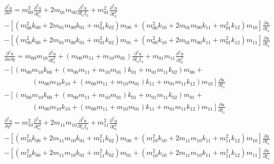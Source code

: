 \documentclass[a4paper,12pt]{article}
\begin{document}
\begin{eqnarray}
&&\displaystyle{\frac{\partial^2 u}{\partial x^2} = m_{00}^2\frac{\partial^2 u}{\partial \xi_1^2} +  2m_{01}m_{00}\frac{\partial^2 u}{\partial \xi_1 \xi_2} + m_{01}^2\frac{\partial^2 u}{\partial \xi_2^2} }\\[3mm]
&&\displaystyle{ - \left[ \left(m_{00}^2 k_{00} + 2m_{01}m_{00}k_{01} + m_{01}^2 k_{02} \right)m_{00} + \left(m_{00}^2 k_{10} + 2m_{01}m_{00}k_{11} + m_{01}^2 k_{12} \right)m_{10}\right] \frac{\partial u}{\partial \xi_1}}\nonumber\\[3mm]
&&\displaystyle{ - \left[ \left(m_{00}^2 k_{00} + 2m_{01}m_{00}k_{01} + m_{01}^2 k_{02} \right)m_{01} + \left(m_{00}^2 k_{10} + 2m_{01}m_{00}k_{11} + m_{01}^2 k_{12} \right)m_{11}\right] \frac{\partial u}{\partial \xi_1}}
\nonumber\\[50mm]
&&\displaystyle{\frac{\partial^2 u}{\partial x \partial y} = m_{00}m_{10}\frac{\partial^2 u}{\partial \xi_1^2} +  (m_{00}m_{11} + m_{10}m_{01})\frac{\partial^2 u}{\partial \xi_1 \xi_2} + m_{01}m_{11}\frac{\partial^2 u}{\partial \xi_2^2} }\\[3mm]
&&\displaystyle{ - \left[ \left(m_{00}m_{10} k_{00} + (m_{00}m_{11} + m_{10}m_{01})k_{01} + m_{01}m_{11} k_{02} \right)m_{00} + \right.}\nonumber\\[3mm]
&&\displaystyle{\qquad\qquad\left. \left(m_{00}m_{10} k_{10} + (m_{00}m_{11} + m_{10}m_{01})k_{11} + m_{01}m_{11} k_{12} \right)m_{10}\right] \frac{\partial u}{\partial \xi_1}}\nonumber\\[3mm]
&&\displaystyle{ - \left[ \left(m_{00}m_{10} k_{00} + (m_{00}m_{11} + m_{10}m_{01})k_{01} + m_{01}m_{11} k_{02} \right)m_{01} + \right.}\nonumber\\[3mm]
&&\displaystyle{\qquad\qquad\left.\left(m_{00}m_{10} k_{10} + (m_{00}m_{11} + m_{10}m_{01})k_{11} + m_{01}m_{11} k_{12} \right)m_{11}\right] \frac{\partial u}{\partial \xi_1}}
\nonumber\\[3mm]
&&\displaystyle{\frac{\partial^2 u}{\partial y^2} = m_{10}^2\frac{\partial^2 u}{\partial \xi_1^2} +  2m_{11}m_{10}\frac{\partial^2 u}{\partial \xi_1 \xi_2} + m_{11}^2\frac{\partial^2 u}{\partial \xi_2^2}} \\[3mm]
&&\displaystyle{ - \left[ \left(m_{10}^2 k_{00} + 2m_{11}m_{10}k_{01} + m_{11}^2 k_{02} \right)m_{00} + \left(m_{10}^2 k_{10} + 2m_{11}m_{10}k_{11} + m_{11}^2 k_{12} \right)m_{10}\right] \frac{\partial u}{\partial \xi_1}}\nonumber\\[3mm]
&&\displaystyle{ - \left[ \left(m_{10}^2 k_{00} + 2m_{11}m_{10}k_{01} + m_{11}^2 k_{02} \right)m_{01} + \left(m_{10}^2 k_{10} + 2m_{11}m_{10}k_{11} + m_{11}^2 k_{12} \right)m_{11}\right] \frac{\partial u}{\partial \xi_1}}\nonumber
\end{eqnarray}
\end{document}
